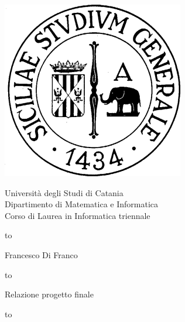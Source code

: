 \begin{titlepage}
\begin{center}


\noindent\begin{minipage}{0.2\textwidth}%
\includegraphics[scale=0.25, bb=0 0 200 200]{./img/logo_unict2.png}
\vspace{0.4truecm}
\end{minipage}%
\begin{minipage}{0.8\textwidth}
\begin{center}
\Large{	Università degli Studi di Catania \\
			Dipartimento di Matematica e Informatica \\
			Corso di Laurea in Informatica triennale }

\vspace{0.4truecm}
\end{center}
\end{minipage}
\hbox to \textwidth{\hrulefill}

\vspace{1.5truecm}
\Large {\sc Francesco Di Franco}
\vspace{1.0truecm}


\LARGE{}


\vspace{2.0truecm}
\begin{minipage}[t][3cm][b]{0,5\textwidth}
\hbox to \textwidth{\hrulefill}
\begin{center}
\vspace{0,6truecm}
Relazione progetto finale
\end{center}

\hbox to \textwidth{\hrulefill}
\end{minipage}



\end{center}
\end{titlepage}
